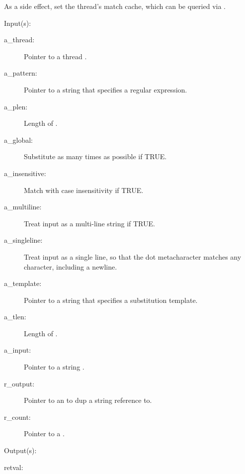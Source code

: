\begin{capi}
\begin{capilist}
		As a side effect, set the thread's match cache, which can be
		queried via .
	\end{capilist}
\label{nxo_regsub_nonew_subst}
	\begin{capilist}
	\item[Input(s): ]
		\begin{description}\item[]
		\item[a\_thread: ]
			Pointer to a thread .
		\item[a\_pattern: ]
			Pointer to a string that specifies a regular expression.
		\item[a\_plen: ]
			Length of .
		\item[a\_global: ]
			Substitute as many times as possible if TRUE.
		\item[a\_insensitive: ]
			Match with case insensitivity if TRUE.
		\item[a\_multiline: ]
			Treat input as a multi-line string if TRUE.
		\item[a\_singleline: ]
			Treat input as a single line, so that the dot
			metacharacter matches any character, including a
			newline.
		\item[a\_template: ]
			Pointer to a string that specifies a substitution
			template.
		\item[a\_tlen: ]
			Length of .
		\item[a\_input: ]
			Pointer to a string .
		\item[r\_output: ]
			Pointer to an  to dup a string reference
			to.
		\item[r\_count: ]
			Pointer to a .
		\end{description}
	\item[Output(s): ]
		\begin{description}\item[]
		\item[retval: ]
			\begin{description}\item[]

\end{description}
\end{description}
\end{capilist}
\end{capi}
